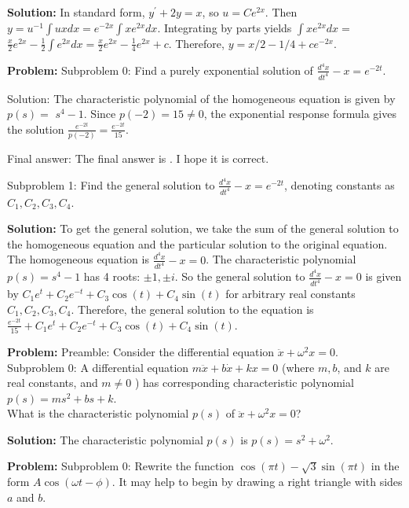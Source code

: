\documentclass[10pt]{article}
\begin{document}
\textbf{Solution:}
In standard form, $y^{\prime}+2 y=x$, so $u=C e^{2 x}$. Then $y=u^{-1} \int u x d x=e^{-2 x} \int x e^{2 x} d x$. Integrating by parts yields $\int x e^{2 x} d x=$ $\frac{x}{2} e^{2 x}-\frac{1}{2} \int e^{2 x} d x=\frac{x}{2} e^{2 x}-\frac{1}{4} e^{2 x}+c$. Therefore, $y=\boxed{x / 2-1 / 4+c e^{-2 x}}$.


\textbf{Problem:}
Subproblem 0: Find a purely exponential solution of $\frac{d^{4} x}{d t^{4}}-x=e^{-2 t}$.


Solution: The characteristic polynomial of the homogeneous equation is given by $p(s)=$ $s^{4}-1$. Since $p(-2)=15 \neq 0$, the exponential response formula gives the solution $\frac{e^{-2 t}}{p(-2)}=\boxed{\frac{e^{-2 t}}{15}}$.

Final answer: The final answer is . I hope it is correct.

Subproblem 1: Find the general solution to $\frac{d^{4} x}{d t^{4}}-x=e^{-2 t}$, denoting constants as $C_{1}, C_{2}, C_{3}, C_{4}$.


\textbf{Solution:}
To get the general solution, we take the sum of the general solution to the homogeneous equation and the particular solution to the original equation. The homogeneous equation is $\frac{d^{4} x}{d t^{4}}-x=0$. The characteristic polynomial $p(s)=s^{4}-1$ has 4 roots: $\pm 1, \pm i$. So the general solution to $\frac{d^{4} x}{d t^{4}}-x=0$ is given by $C_{1} e^{t}+C_{2} e^{-t}+C_{3} \cos (t)+C_{4} \sin (t)$ for arbitrary real constants $C_{1}, C_{2}, C_{3}, C_{4}$.
Therefore, the general solution to the equation is $\boxed{\frac{e^{-2 t}}{15}+C_{1} e^{t}+C_{2} e^{-t}+ C_{3} \cos (t)+C_{4} \sin (t)}$.


\textbf{Problem:}
Preamble: Consider the differential equation $\ddot{x}+\omega^{2} x=0$. \\

Subproblem 0: A differential equation $m \ddot{x}+b \dot{x}+k x=0$ (where $m, b$, and $k$ are real constants, and $m \neq 0$ ) has corresponding characteristic polynomial $p(s)=m s^{2}+b s+k$.\\
What is the characteristic polynomial $p(s)$ of $\ddot{x}+\omega^{2} x=0$?


\textbf{Solution:}
The characteristic polynomial $p(s)$ is $p(s)=\boxed{s^{2}+\omega^{2}}$.


\textbf{Problem:}
Subproblem 0: Rewrite the function $\cos (\pi t)-\sqrt{3} \sin (\pi t)$ in the form $A \cos (\omega t-\phi)$. It may help to begin by drawing a right triangle with sides $a$ and $b$. 
\end{document}
